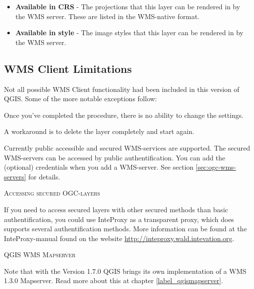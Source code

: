 \begin{itemize}[label=--]
\begin{itemize}[label=--]
\item \textbf{Available in CRS} - The projections that this layer can be rendered in by
                                  the WMS server.  These are listed in the WMS-native format.

\item \textbf{Available in style} - The image styles that this layer can be rendered in by
                                    the WMS server.

\end{itemize}

\end{itemize}


\subsection{WMS Client Limitations}\label{sec:ogc-wms-limits}

Not all possible WMS Client functionality had been included in this version of QGIS.
Some of the more notable exceptions follow:


Once you've completed the 
procedure, there is no ability to change the settings.

A workaround is to delete the layer completely and start again.


Currently public accessible and secured WMS-services are supported.
The secured WMS-servers can be accessed by public authentification. You
can add the (optional) credentials when you add a WMS-server. See section
\ref{sec:ogc-wms-servers} for details.

\begin{Tip}[ht]\caption{\textsc{Accessing secured OGC-layers}}
If you need to access secured layers with other secured methods
than basic authentification, you could use InteProxy as
a transparent proxy, which does supports several authentification methods.
More information can be found at the InteProxy-manual found on the website
\url{http://inteproxy.wald.intevation.org}.
\end{Tip}

\begin{Tip}[ht]\caption{\textsc{QGIS WMS Mapserver}}
Note that with the Version 1.7.0 QGIS brings its own implementation of a
WMS 1.3.0 Mapserver. Read more about this at chapter
\ref{label_qgismapserver}.
\end{Tip}




